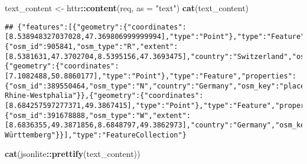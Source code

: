 \documentclass[]{book}
\newenvironment{Shaded}{\begin{snugshade}}{\end{snugshade}}
\newcommand{\DataTypeTok}[1]{\textcolor[rgb]{0.13,0.29,0.53}{#1}}
\newcommand{\KeywordTok}[1]{\textcolor[rgb]{0.13,0.29,0.53}{\textbf{#1}}}
\newcommand{\NormalTok}[1]{#1}
\newcommand{\OperatorTok}[1]{\textcolor[rgb]{0.81,0.36,0.00}{\textbf{#1}}}
\newcommand{\StringTok}[1]{\textcolor[rgb]{0.31,0.60,0.02}{#1}}
\begin{document}
\begin{Shaded}
\begin{Highlighting}[]
\NormalTok{text_content <-}\StringTok{ }\NormalTok{httr}\OperatorTok{::}\KeywordTok{content}\NormalTok{(req, }\DataTypeTok{as =} \StringTok{"text"}\NormalTok{)}
\KeywordTok{cat}\NormalTok{(text_content)}
\end{Highlighting}
\end{Shaded}

\begin{verbatim}
## {"features":[{"geometry":{"coordinates":[8.538948327037028,47.369806999999994],"type":"Point"},"type":"Feature","properties":{"osm_id":905841,"osm_type":"R","extent":[8.5381631,47.3702704,8.5395156,47.3693475],"country":"Switzerland","osm_key":"highway","city":"Zurich","osm_value":"pedestrian","postcode":"8001","name":"Paradeplatz","state":"Zurich"}},{"geometry":{"coordinates":[7.1082488,50.8860177],"type":"Point"},"type":"Feature","properties":{"osm_id":389550464,"osm_type":"N","country":"Germany","osm_key":"place","city":"Cologne","osm_value":"locality","postcode":"51147","name":"Paradeplatz","state":"North Rhine-Westphalia"}},{"geometry":{"coordinates":[8.684257597277371,49.3867415],"type":"Point"},"type":"Feature","properties":{"osm_id":391678888,"osm_type":"W","extent":[8.6836355,49.3871856,8.6848797,49.3862973],"country":"Germany","osm_key":"place","city":"Heidelberg","osm_value":"locality","postcode":"69120","name":"Paradeplatz","state":"Baden-Württemberg"}}],"type":"FeatureCollection"}
\end{verbatim}

\begin{Shaded}
\begin{Highlighting}[]
\KeywordTok{cat}\NormalTok{(jsonlite}\OperatorTok{::}\KeywordTok{prettify}\NormalTok{(text_content))}
\end{Highlighting}
\end{Shaded}
\end{document}
